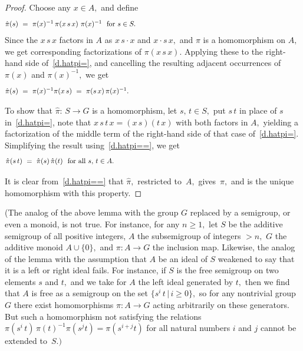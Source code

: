 \documentclass{amsart}
\numberwithin{equation}{section}
\numberwithin{theorem}{section}
\begin{document}
\begin{proof}
Choose any $x\in A,$ and define
%
\begin{equation}\begin{minipage}[c]{35pc}\label{d.hatpi=}
$\hat{\pi}(s)~=~\pi(x)^{-1}\,\pi(x\,s\,x)~\pi(x)^{-1}$ \ for $s\in S.$
\end{minipage}\end{equation}
%
Since the $x\,s\,x$ factors in $A$ as $x\,s\cdot x$ and $x\cdot s\,x,$
and $\pi$ is a homomorphism on $A,$ we get
corresponding factorizations of $\pi(x\,s\,x).$
Applying these to the right-hand side of~\eqref{d.hatpi=}, and
cancelling the resulting adjacent occurrences of
$\pi(x)$ and $\pi(x)^{-1},$ we get
%
\begin{equation}\begin{minipage}[c]{35pc}\label{d.hatpi==}
$\hat{\pi}(s)~=~\pi(x)^{-1}\pi(x\,s)~=~\pi(s\,x)\,\pi(x)^{-1}.$
\end{minipage}\end{equation}

To show that $\hat{\pi}:\,S\to G$ is a homomorphism,
let $s,\,t\in S,$ put $s\,t$ in place of $s$ in~\eqref{d.hatpi=},
note that $x\,s\,t\,x=(x\,s)(t\,x)$ with both factors
in $A,$ yielding a factorization of the middle term of
the right-hand side of that case of~\eqref{d.hatpi=}.
Simplifying the result using~\eqref{d.hatpi==}, we get
%
\begin{equation}\begin{minipage}[c]{35pc}\label{d.pi_xs}
$\hat{\pi}(s\,t)~=~\hat{\pi}(s)\,\hat{\pi}(t)$ \ for all $s,\,t\in A.$
\end{minipage}\end{equation}

It is clear from~\eqref{d.hatpi==} that $\hat{\pi},$ restricted
to~$A,$ gives~$\pi,$ and is the unique homomorphism with this property.
\end{proof}

(The analog of the above lemma with the group $G$ replaced by
a semigroup, or even a monoid, is not true.
For instance, for any $n\geq 1,$ let
$S$ be the additive semigroup of all positive integers,
$A$ the subsemigroup of integers $>n,$
$G$ the additive monoid $A\cup\{0\},$ and
$\pi: A\to G$ the inclusion map.
Likewise, the analog of the lemma with the assumption that $A$ be an
ideal of $S$ weakened to say that it is a left or right ideal fails.
For instance, if $S$ is the free semigroup on two
elements $s$ and $t,$ and we take for $A$ the left ideal
generated by $t,$ then we find that $A$ is free as a
semigroup on the set $\{s^i\,t\,|\,i\geq 0\},$
so for any nontrivial group $G$ there exist homomorphisms
$\pi:A\to G$ acting arbitrarily on these generators.
But such a homomorphism not satisfying
the relations $\pi(s^i\,t)\,\pi(t)^{-1}\pi(s^jt)=\pi(s^{i+j}t)$
for all natural numbers $i$ and $j$ cannot be extended to~$S.)$
\end{document}
